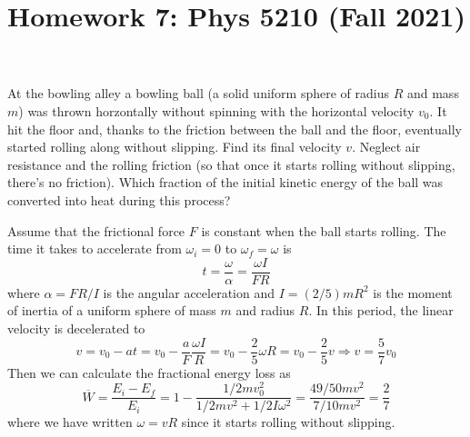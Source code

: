 \documentclass[12pt]{article}
\title{Homework 7: Phys 5210 (Fall 2021)}
\begin{document}
\maketitle
\begin{problem}{1}
At the bowling alley a bowling ball (a solid uniform sphere of radius $R$ and
mass $m$) was thrown horzontally without spinning with the horizontal velocity
$v_0$. It hit the floor and, thanks to the friction between the ball and the
floor, eventually started rolling along without slipping. Find its final
velocity $v$. Neglect air resistance and the rolling friction (so that once it
starts rolling without slipping, there's no friction). Which fraction of the
initial kinetic energy of the ball was converted into heat during this process?
\begin{solution}
Assume that the frictional force $F$ is constant when the ball starts rolling. 
The time it takes to accelerate from $\omega_i=0$ to $\omega_f=\omega$
is
\begin{equation}
    t=\frac{\omega}{\alpha}=\frac{\omega I}{F R}
\end{equation}
where $\alpha =FR / I$ is the angular acceleration and $I=(2 /5)mR^2$ is the
moment of inertia of a uniform sphere of mass $m$ and radius $R$. In this
period, the linear velocity is decelerated to
\begin{equation}
    v=v_0-at=v_0-\frac{a}{F}\frac{\omega I}{R}=v_0-\frac25\omega R=v_0-\frac25v 
    \Rightarrow v=\frac57v_0
\end{equation}
Then we can calculate the fractional energy loss as
\begin{equation}
    \overline{W}=\frac{E_i-E_f}{E_i}=1-\frac{1 /2mv_0^2}{1/2mv^2+1/2I\omega^2} 
    =\frac{49/50mv^2}{7/10mv^2}=\frac27
\end{equation}
where we have written $\omega=vR$ since it starts rolling without slipping.
\end{solution}
\end{problem}
\end{document}
